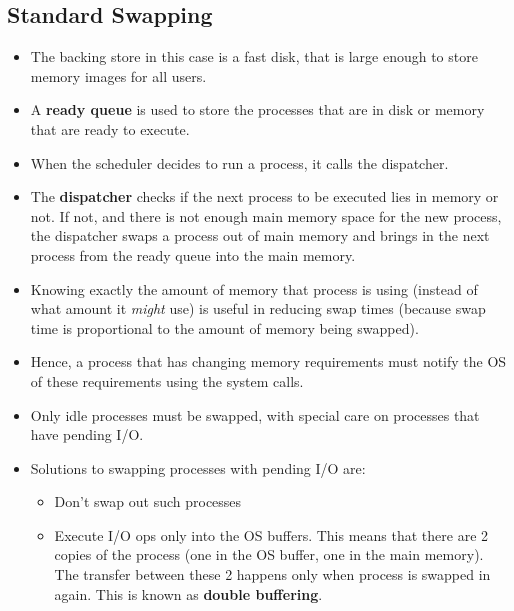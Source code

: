 \documentclass{article}
\theoremstyle{plain}
\theoremstyle{definition}
\begin{document}
\subsection{Standard Swapping}
\begin{itemize}
    \item The backing store in this case is a fast disk, that is large enough to store memory images for all users.
    
    \item A \textbf{ready queue} is used to store the processes that are in disk or memory that are ready to execute. 
    
    \item When the scheduler decides to run a process, it calls the dispatcher.
    
    \item The \textbf{dispatcher} checks if the next process to be executed lies in memory or not. If not, and there is not enough main memory space for the new process, the dispatcher swaps a process out of main memory and brings in the next process from the ready queue into the main memory.
    
    \item Knowing exactly the amount of memory that process is using (instead of what amount it \textit{might} use) is useful in reducing swap times (because swap time is proportional to the amount of memory being swapped). 
    
    \item Hence, a process that has changing memory requirements must notify the OS of these requirements using the system calls. 
    
    \item Only idle processes must be swapped, with special care on processes that have pending I/O.
    
    \item Solutions to swapping processes with pending I/O are:
    \begin{itemize}
        \item Don't swap out such processes
        
        \item Execute I/O ops only into the OS buffers. This means that there are 2 copies of the process (one in the OS buffer, one in the main memory). The transfer between these 2 happens only when process is swapped in again. This is known as \textbf{double buffering}. 
    \end{itemize}
    

\end{itemize}
\end{document}
